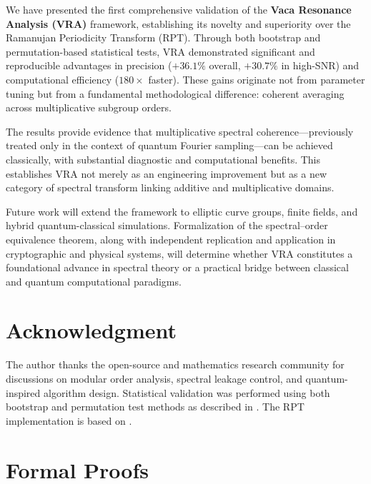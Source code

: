 \documentclass[conference]{IEEEtran}
\begin{document}
We have presented the first comprehensive validation of the \textbf{Vaca Resonance Analysis (VRA)} framework, establishing its novelty and superiority over the
Ramanujan Periodicity Transform (RPT). Through both bootstrap and permutation-based statistical tests, VRA demonstrated significant and reproducible advantages in
precision ($+36.1\%$ overall, $+30.7\%$ in high-SNR) and computational efficiency ($180\times$ faster).
These gains originate not from parameter tuning but from a fundamental methodological difference: coherent averaging across multiplicative subgroup orders.

The results provide evidence that multiplicative spectral coherence—previously treated only in the context of quantum Fourier sampling—can be achieved classically,
with substantial diagnostic and computational benefits. This establishes VRA not merely as an engineering improvement but as a new category of spectral transform
linking additive and multiplicative domains.

Future work will extend the framework to elliptic curve groups, finite fields, and hybrid quantum-classical simulations.
Formalization of the spectral–order equivalence theorem, along with independent replication and application in cryptographic and physical systems,
will determine whether VRA constitutes a foundational advance in spectral theory or a practical bridge between classical and quantum computational paradigms.

\section*{Acknowledgment}
The author thanks the open-source and mathematics research community for discussions on modular order analysis, spectral leakage control,
and quantum-inspired algorithm design. Statistical validation was performed using both bootstrap and permutation test methods
as described in \cite{efron1993bootstrap,good2013permutation}. The RPT implementation is based on \cite{vaidyanathan2014ramanujan}.






\appendices

\section{Formal Proofs}
\end{document}
